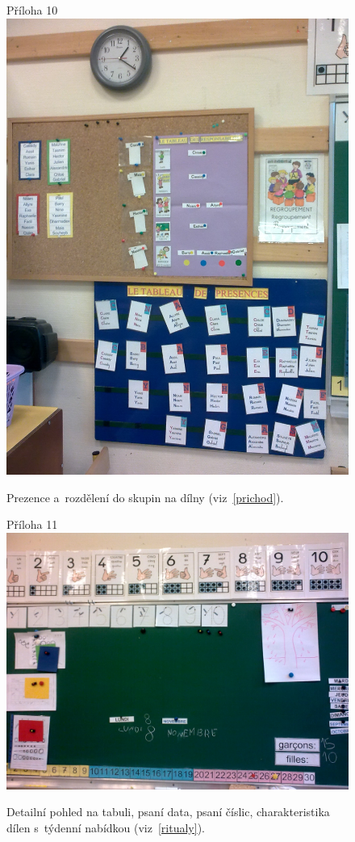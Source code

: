 	\begin{figure}[tb]
		\centering
		Příloha 10\\
		\includegraphics[height=0.35\textheight]{./fotky/Obr10.jpg}
		\caption{
			Prezence a~rozdělení do skupin na dílny (viz~\ref{prichod}).
		}
		\label{Obr10}
	\end{figure}

	\begin{figure}[tb]
		\centering
		Příloha 11\\
		\includegraphics[height=0.35\textheight]{./fotky/Obr11.jpg}
		\caption{
			Detailní pohled na tabuli, psaní data, psaní číslic, charakteristika dílen s~týdenní nabídkou  (viz~\ref{ritualy}).
		}
		\label{Obr11}
	\end{figure}

